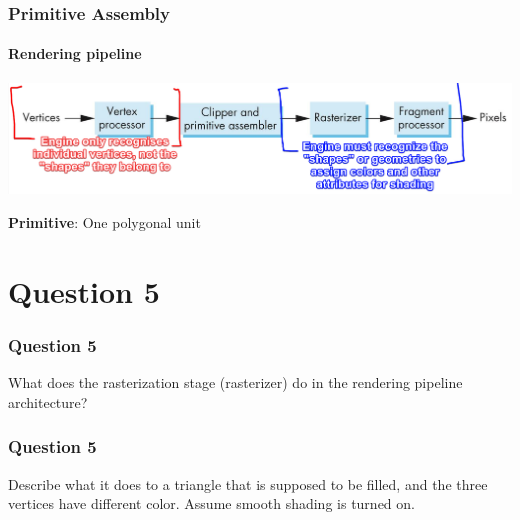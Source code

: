\documentclass{beamer}
\begin{document}
\begin{frame}
    \frametitle{Primitive Assembly}
    \framesubtitle{Rendering pipeline}
    
    {\centering \includegraphics[scale=0.4]{simple-pipeline-annot.png}}

    \vspace{1em}

    \begin{tcolorbox}
        \textbf{Primitive}: One polygonal unit
    \end{tcolorbox}

\end{frame}

\section{Question 5}

\begin{frame}
    \frametitle{Question 5}
    What does the rasterization stage (rasterizer) do in the rendering pipeline architecture?
\end{frame}

\begin{frame}
    \frametitle{Question 5}
    Describe what it does to a triangle that is supposed to be filled, and the three vertices have
    different color. Assume smooth shading is turned on.
\end{frame}
\end{document}
